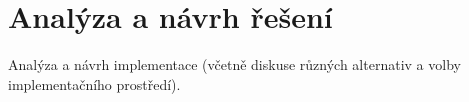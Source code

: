 \chapter{Analýza a návrh řešení}
Analýza a návrh implementace (včetně diskuse různých alternativ a volby implementačního prostředí).